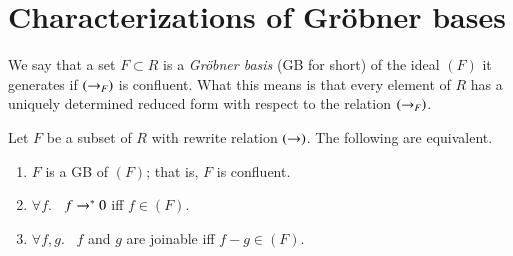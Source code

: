 \documentclass{llncs}
\begin{document}
\section{Characterizations of Gr\"obner bases}

We say that a set $F\subset R$ is a {\it Gr\"obner basis} (GB for short)
of the ideal $(F)$ it generates if $(\rightarrow_F)$ is confluent.  What this means is that every element of $R$ has a uniquely determined reduced form with respect to the relation $(\rightarrow_F)$.

\begin{lemma} Let $F$ be a subset of $R$ with rewrite relation $(\rightarrow)$.  
The following are equivalent.
\begin{enumerate} 
\item $F$ is a GB of $(F)$; that is, $F$ is confluent.
\item $\forall f$.~  $f\rightarrow^* 0$ iff $f\in (F)$.
\item $\forall f,g$.~ $f$ and $g$ are joinable iff $f-g\in (F)$.
\end{enumerate}
\end{lemma}
\end{document}
